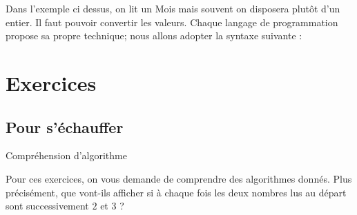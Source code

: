 				Dans l'exemple ci dessus, on lit un Mois mais souvent
				on disposera plutôt d'un entier. Il faut pouvoir
				convertir les valeurs. Chaque langage de programmation propose sa
				propre technique; nous allons adopter la syntaxe suivante :


	\section{Exercices}

		\subsection{Pour s'échauffer}

\begin{Exercice}{Compréhension d'algorithme}

	Pour ces exercices, on vous demande de comprendre des algorithmes
	donnés. Plus précisément, que vont-ils afficher si à chaque fois les
	deux nombres lus au départ sont successivement $2$ et $3$ ?






\end{Exercice}

